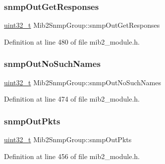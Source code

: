\mbox{\label{structMib2SnmpGroup_aeabd9ab6b12c378ae4b7f58796e40ed8}} 
\subsubsection{\texorpdfstring{snmp\+Out\+Get\+Responses}{snmpOutGetResponses}}
{\footnotesize\ttfamily \hyperlink{stdint_8h_a435d1572bf3f880d55459d9805097f62}{uint32\+\_\+t} Mib2\+Snmp\+Group\+::snmp\+Out\+Get\+Responses}



Definition at line 480 of file mib2\+\_\+module.\+h.

\mbox{\label{structMib2SnmpGroup_a717a5bfe462fb42b2d184524971c9d82}} 
\subsubsection{\texorpdfstring{snmp\+Out\+No\+Such\+Names}{snmpOutNoSuchNames}}
{\footnotesize\ttfamily \hyperlink{stdint_8h_a435d1572bf3f880d55459d9805097f62}{uint32\+\_\+t} Mib2\+Snmp\+Group\+::snmp\+Out\+No\+Such\+Names}



Definition at line 474 of file mib2\+\_\+module.\+h.

\mbox{\label{structMib2SnmpGroup_a554433e74a793832332c1d7aa54f686a}} 
\subsubsection{\texorpdfstring{snmp\+Out\+Pkts}{snmpOutPkts}}
{\footnotesize\ttfamily \hyperlink{stdint_8h_a435d1572bf3f880d55459d9805097f62}{uint32\+\_\+t} Mib2\+Snmp\+Group\+::snmp\+Out\+Pkts}



Definition at line 456 of file mib2\+\_\+module.\+h.

